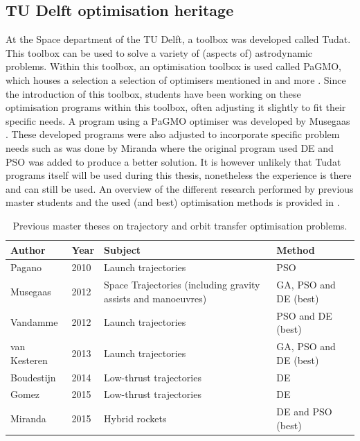 \subsection{TU Delft optimisation heritage}
\label{subsec:tuher}
At the Space department of the TU Delft, a toolbox was developed called Tudat. This toolbox can be used to solve a variety of (aspects of) astrodynamic problems. Within this toolbox, an optimisation toolbox is used called \ac{PaGMO}, which houses a selection a selection of optimisers mentioned in  and more \cite{boudestijn2014}. Since the introduction of this toolbox, students have been working on these optimisation programs within this toolbox, often adjusting it slightly to fit their specific needs. A program using a \ac{PaGMO} optimiser was developed by Musegaas \cite{musegaas2012}. These developed programs were also adjusted to incorporate specific problem needs such as was done by Miranda \cite{miranda2015} where the original program used \ac{DE} and \ac{PSO} was added to produce a better solution. It is however unlikely that Tudat programs itself will be used during this thesis, nonetheless the experience is there and can still be used. An overview of the different research performed by previous master students and the used (and best) optimisation methods is provided in .


\begin{table}[!ht]
\begin{center}
\caption{Previous master theses on trajectory and orbit transfer optimisation problems.}
\label{tab:prevmethtu}
\begin{tabular}{|l|l|p{5cm}|l|}
\hline 
\textbf{Author} 		& \textbf{Year} & \textbf{Subject} & \textbf{Method} \\ \hline \hline
Pagano \cite{pagano2010global} & 2010 & Launch trajectories& \ac{PSO} \\ \hline
Musegaas \cite{musegaas2012} & 2012 & Space Trajectories (including gravity assists and manoeuvres) & \ac{GA}, \ac{PSO} and \ac{DE} (best) \\ \hline
Vandamme \cite{vandamme2012assisted}  & 2012 & Launch trajectories & \ac{PSO} and \ac{DE} (best)   \\ \hline
van Kesteren \cite{kesteren2013air} & 2013 & Launch trajectories & \ac{GA}, \ac{PSO} and \ac{DE} (best) \\ \hline
Boudestijn \cite{boudestijn2014} & 2014 & Low-thrust trajectories & \ac{DE} \\ \hline
Gomez \cite{gomez2015optimization} & 2015 & Low-thrust trajectories & \ac{DE} \\ \hline
Miranda \cite{miranda2015} & 2015 & Hybrid rockets & \ac{DE} and \ac{PSO} (best) \\ \hline
 		
\end{tabular}
\end{center}
\end{table}


